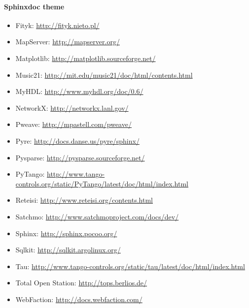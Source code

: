 \documentclass[letterpaper,10pt,english]{sphinxmanual}
\begin{document}
\paragraph{Sphinxdoc theme}
\label{jupyter/sphinx_quickstart:Sphinxdoc-theme}\begin{itemize}
\item {} 
Fityk: \url{http://fityk.nieto.pl/}

\item {} 
MapServer: \url{http://mapserver.org/}

\item {} 
Matplotlib: \url{http://matplotlib.sourceforge.net/}

\item {} 
Music21: \url{http://mit.edu/music21/doc/html/contents.html}

\item {} 
MyHDL: \url{http://www.myhdl.org/doc/0.6/}

\item {} 
NetworkX: \url{http://networkx.lanl.gov/}

\item {} 
Pweave: \url{http://mpastell.com/pweave/}

\item {} 
Pyre: \url{http://docs.danse.us/pyre/sphinx/}

\item {} 
Pysparse: \url{http://pysparse.sourceforge.net/}

\item {} 
PyTango:
\url{http://www.tango-controls.org/static/PyTango/latest/doc/html/index.html}

\item {} 
Reteisi: \url{http://www.reteisi.org/contents.html}

\item {} 
Satchmo: \url{http://www.satchmoproject.com/docs/dev/}

\item {} 
Sphinx: \url{http://sphinx.pocoo.org/}

\item {} 
Sqlkit: \url{http://sqlkit.argolinux.org/}

\item {} 
Tau:
\url{http://www.tango-controls.org/static/tau/latest/doc/html/index.html}

\item {} 
Total Open Station: \url{http://tops.berlios.de/}

\item {} 
WebFaction: \url{http://docs.webfaction.com/}

\end{itemize}
\end{document}
